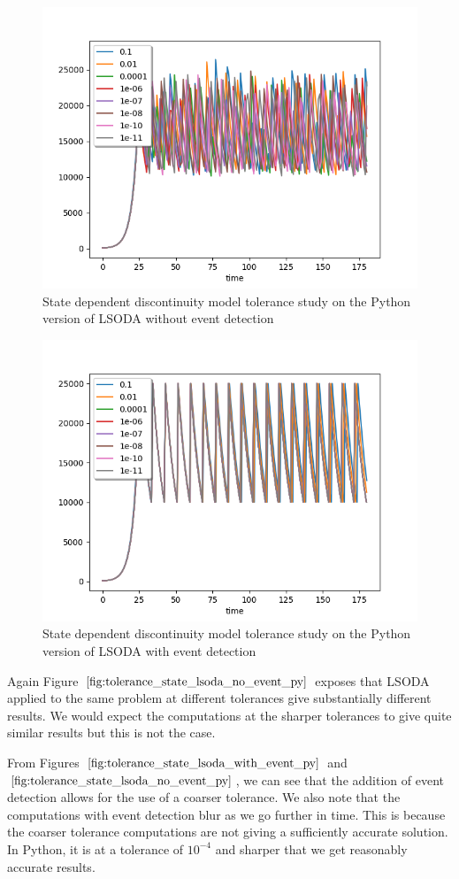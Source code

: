 \begin{figure}[h]
\centering
\includegraphics[width=0.7\linewidth]{./figures/tolerance_state_lsoda_no_event_py}
\caption{State dependent discontinuity model tolerance study on the Python version of LSODA without event detection}
\label{fig:tolerance_state_lsoda_no_event_py}
\end{figure}

\begin{figure}[h]
\centering
\includegraphics[width=0.7\linewidth]{./figures/tolerance_state_lsoda_with_event_py}
\caption{State dependent discontinuity model tolerance study on the Python version of LSODA with event detection}
\label{fig:tolerance_state_lsoda_with_event_py}
\end{figure}

Again Figure $\ref{fig:tolerance_state_lsoda_no_event_py}$ exposes that LSODA applied to the same problem at different tolerances give substantially different results. We would expect the computations at the sharper tolerances to give quite similar results but this is not the case.

From Figures $\ref{fig:tolerance_state_lsoda_with_event_py}$ and $\ref{fig:tolerance_state_lsoda_no_event_py}$, we can see that the addition of event detection allows for the use of a coarser tolerance. We also note that the computations with event detection blur as we go further in time. This is because the coarser tolerance computations are not giving a sufficiently accurate solution. In Python, it is at a tolerance of $10^{-4}$ and sharper that we get reasonably accurate results. 

